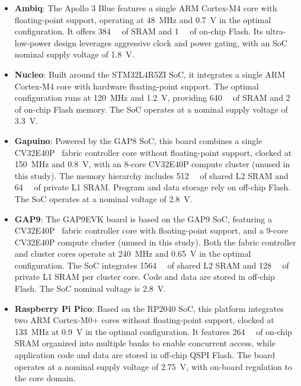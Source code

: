                 \vspace{-1em}
                \begin{itemize}
                    \item \textbf{Ambiq}: The Apollo 3 Blue features a single ARM Cortex-M4 core with floating-point support, operating at \SI{48}{\mega\hertz} and \SI{0.7}{\volt} in the optimal configuration. It offers \SI{384}{\kibi\byte} of SRAM and \SI{1}{\mega\byte} of on-chip Flash. Its ultra-low-power design leverages aggressive clock and power gating, with an SoC nominal supply voltage of \SI{1.8}{\volt}.
                
                    \item \textbf{Nucleo}: Built around the STM32L4R5ZI SoC, it integrates a single ARM Cortex-M4 core with hardware floating-point support. The optimal configuration runs at \SI{120}{\mega\hertz} and \SI{1.2}{\volt}, providing \SI{640}{\kibi\byte} of SRAM and \SI{2}{\mega\byte} of on-chip Flash memory. The SoC operates at a nominal supply voltage of \SI{3.3}{\volt}.
                
                    \item \textbf{Gapuino}: Powered by the GAP8 SoC, this board combines a single CV32E40P~\cite{ri5cy} fabric controller core without floating-point support, clocked at \SI{150}{\mega\hertz} and \SI{0.8}{\volt}, with an 8-core CV32E40P compute cluster (unused in this study). The memory hierarchy includes \SI{512}{\kibi\byte} of shared L2 SRAM and \SI{64}{\kibi\byte} of private L1 SRAM. Program and data storage rely on off-chip Flash. The SoC operates at a nominal voltage of \SI{2.8}{\volt}.
                
                    \item \textbf{GAP9}: The GAP9EVK board is based on the GAP9 SoC, featuring a CV32E40P~\cite{ri5cy} fabric controller core with floating-point support, and a 9-core CV32E40P compute cluster (unused in this study). Both the fabric controller and cluster cores operate at \SI{240}{\mega\hertz} and \SI{0.65}{\volt} in the optimal configuration. The SoC integrates \SI{1564}{\kibi\byte} of shared L2 SRAM and \SI{128}{\kibi\byte} of private L1 SRAM per cluster core. Code and data are stored in off-chip Flash. The SoC nominal voltage is \SI{2.8}{\volt}.

                    \item \textbf{Raspberry Pi Pico}: Based on the RP2040 SoC, this platform integrates two ARM Cortex-M0+ cores without floating-point support, clocked at \SI{133}{\mega\hertz} at \SI{0.9}{\volt} in the optimal configuration. It features \SI{264}{\kibi\byte} of on-chip SRAM organized into multiple banks to enable concurrent access, while application code and data are stored in off-chip QSPI Flash. The board operates at a nominal supply voltage of \SI{2.75}{\volt}, with on-board regulation to the core domain.
                \end{itemize}
                \vspace{-1em}
                
